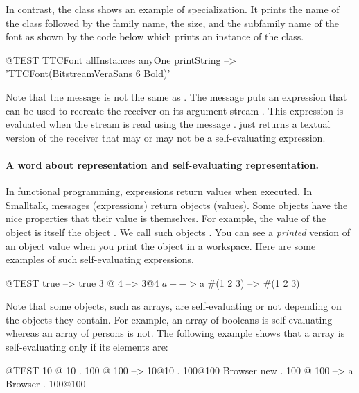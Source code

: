 \documentclass[a4paper,10pt,twoside]{book}
\begin{document}
In contrast, the class  shows an example of  specialization.
It prints the name of the class followed by the family name, the size, and the subfamily name of the font as shown by the code below which prints an instance of the class.


\begin{code}{@TEST}
TTCFont allInstances anyOne printString --> 'TTCFont(BitstreamVeraSans 6 Bold)'
\end{code}

Note that the message  is not the same as .
The message  puts an expression that can be used to recreate the receiver on its argument stream .
This expression is evaluated when the stream is read using the message .
 just returns a textual version of the receiver that may or may not be a self-evaluating expression.

\paragraph{A word about representation and self-evaluating representation.}
In functional programming, expressions return values when executed.
In Smalltalk, messages (expressions) return objects (values).
Some objects have the nice properties that their value is themselves.
For example, the value of the object  is itself \ie the object .
We call such objects .
You can see a \emph{printed} version of an object value when you print the object in a workspace.
Here are some examples of such self-evaluating expressions. 

\begin{code}{@TEST}
true       --> true
3 @ 4     --> 3@4
$a         --> $a
#(1 2 3) --> #(1 2 3)
\end{code}

Note that some objects, such as arrays, are self-evaluating or not depending on the objects they contain.
For example, an array of booleans is self-evaluating whereas an array of persons is not.
The following example shows that a  array is self-evaluating only if its elements are:
\begin{code}{@TEST}
{10 @ 10 . 100 @ 100}          --> {10@10 . 100@100}
{Browser new . 100 @ 100} --> {a Browser . 100@100}
\end{code}
\end{document}
